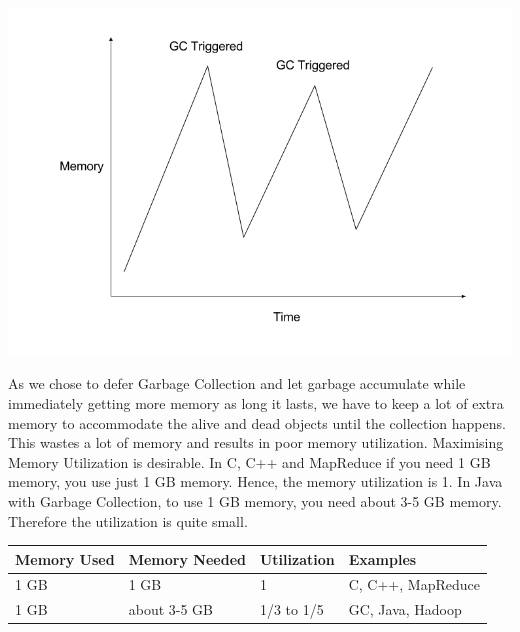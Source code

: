 \documentclass[twoside]{article}
\begin{document}
\includegraphics[width=150mm,scale=0.5]{4.png}

As we chose to defer Garbage Collection and let garbage accumulate while immediately getting more memory as long it lasts, we have to keep a lot of extra memory to accommodate the alive and dead objects until the collection happens. This wastes a lot of memory and results in poor memory utilization. Maximising Memory Utilization is desirable. In C, C++ and MapReduce if you need 1 GB memory, you use just 1 GB memory. Hence, the memory utilization is 1. In Java with Garbage Collection, to use 1 GB memory, you need about 3-5 GB memory. Therefore the utilization is quite small.

\begin{center}
    \begin{tabular}{ | l | l | l | l |}
    \hline
    Memory Used & Memory Needed & Utilization & Examples \\ \hline
    1 GB & 1 GB & 1 & C, C++, MapReduce \\ \hline
    1 GB & about 3-5 GB & 1/3 to 1/5 & GC, Java, Hadoop \\
    \hline
    \end{tabular}
\end{center}
\end{document}
